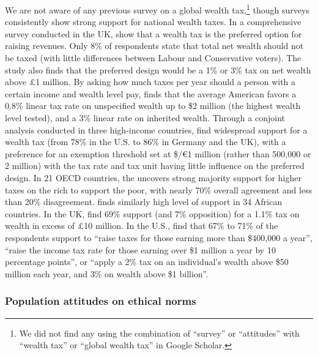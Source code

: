 \documentclass[12pt,english]{article}
\begin{document}
We are not aware of any previous survey on a global wealth tax,\footnote{We did not find any using the combination of ``survey'' or ``attitudes'' with ``wealth tax'' or ``global wealth tax'' in Google Scholar.} though surveys consistently show strong support for national wealth taxes. 
In a comprehensive survey conducted in the UK, \citet{rowlingson_public_2021} show that a wealth tax is the preferred option for raising revenues. Only 8\% of respondents state that total net wealth should not be taxed (with little differences between Labour and Conservative voters). The study also finds that the preferred design would be a 1\% or 3\% tax on net wealth above £1 million. 
By asking how much taxes per year should a person with a certain income and wealth level pay, \citet{fisman_americans_2017} finds that the average American favors a 0.8\% linear tax rate on unspecified wealth up to \$2 million (the highest wealth level tested), and a 3\% linear rate on inherited wealth. %
Through a conjoint analysis conducted in three high-income countries, \citet{schechtl_tax_2023} find widespread support for a wealth tax (from 78\% in the U.S. to 86\% in Germany and the UK), with a preference for an exemption threshold set at \$/\euro{}1 million (rather than 500,000 or 2 million) with the tax rate and tax unit having little influence on the preferred design. 
In 21 OECD countries, the \citet{oecd_main_2019} uncovers strong majority support for higher taxes on the rich to support the poor, with nearly 70\% overall agreement and less than 20\% disagreement. \citet{isbell_footing_2022} finds similarly high level of support in 34 African countries. 
In the UK, \citet{patriotic_millionaires_patriotic_2022} find 69\% support (and 7\% opposition) for a 1.1\% tax on wealth in excess of £10 million. 
In the U.S., \citet{americans_for_tax_fairness_support_2021} find that 67\% to 71\% of the respondents support to ``raise taxes for those earning more than \$400,000 a year'', ``raise the income tax rate for those earning over \$1 million a year by 10 percentage points'', or ``apply a 2\% tax on an individual's wealth above \$50 million each year, and 3\% on wealth above \$1 billion''.



\subsubsection{Population attitudes on ethical norms}\label{subsubsec:literature_wealth_tax}
\end{document}
